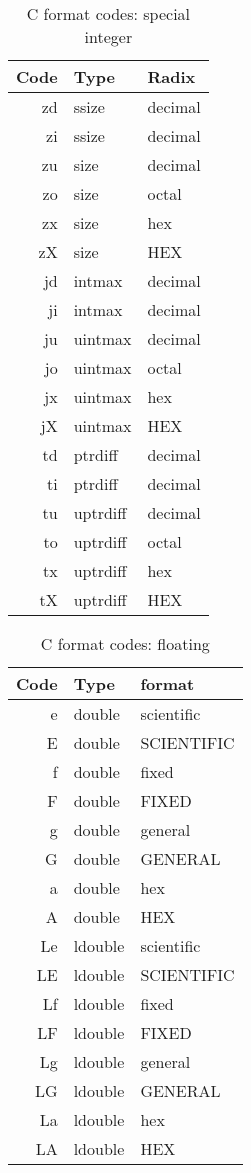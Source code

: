 \documentclass[oneside]{book}
\begin{document}
\begin{table}
\caption{C format codes: special integer\label{C format codes: special integer}}
\centering
\begin{tabular}[c]{rll}
Code&Type&Radix\\
\hline
zd&ssize&decimal\\
zi&ssize&decimal\\
zu&size&decimal\\
zo&size&octal\\
zx&size&hex\\
zX&size&HEX\\
\hline
jd&intmax&decimal\\
ji&intmax&decimal\\
ju&uintmax&decimal\\
jo&uintmax&octal\\
jx&uintmax&hex\\
jX&uintmax&HEX\\
\hline
td&ptrdiff&decimal\\
ti&ptrdiff&decimal\\
tu&uptrdiff&decimal\\
to&uptrdiff&octal\\
tx&uptrdiff&hex\\
tX&uptrdiff&HEX\\
\end{tabular}
\end{table}




\begin{table}
\caption{C format codes: floating\label{C format codes: floating}}
\centering
\begin{tabular}[c]{rll}
Code&Type&format\\
\hline
e&double&scientific\\
E&double&SCIENTIFIC\\
f&double&fixed\\
F&double&FIXED\\
g&double&general\\
G&double&GENERAL\\
a&double&hex\\
A&double&HEX\\
\hline
Le&ldouble&scientific\\
LE&ldouble&SCIENTIFIC\\
Lf&ldouble&fixed\\
LF&ldouble&FIXED\\
Lg&ldouble&general\\
LG&ldouble&GENERAL\\
La&ldouble&hex\\
LA&ldouble&HEX\\
\end{tabular}
\end{table}
\end{document}
